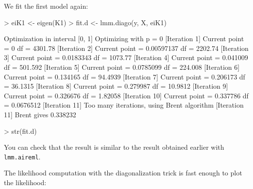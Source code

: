 \documentclass{article}
\renewenvironment{Schunk}{\vspace{\topsep}}{\vspace{\topsep}}
\begin{document}
  We fit the first model again:
 
\begin{Schunk}
\begin{Sinput}
> eiK1 <- eigen(K1)
> fit.d <- lmm.diago(y, X, eiK1)
\end{Sinput}
\begin{Soutput}
Optimization in interval [0, 1]
Optimizing with p = 0
[Iteration 1] Current point = 0 df = 4301.78
[Iteration 2] Current point = 0.00597137 df = 2202.74
[Iteration 3] Current point = 0.0183343 df = 1073.77
[Iteration 4] Current point = 0.041009 df = 501.592
[Iteration 5] Current point = 0.0785099 df = 224.008
[Iteration 6] Current point = 0.134165 df = 94.4939
[Iteration 7] Current point = 0.206173 df = 36.1315
[Iteration 8] Current point = 0.279987 df = 10.9812
[Iteration 9] Current point = 0.326676 df = 1.82058
[Iteration 10] Current point = 0.337786 df = 0.0676512
[Iteration 11] Too many iterations, using Brent algorithm
[Iteration 11] Brent gives 0.338232
\end{Soutput}
\begin{Sinput}
> str(fit.d)
\end{Sinput}
\end{Schunk}
  You can check that the result is similar to the result obtained earlier with 
  \verb!lmm.aireml!.

  The likelihood computation with the diagonalization trick is fast enough to 
  plot the likelihood:
\end{document}
